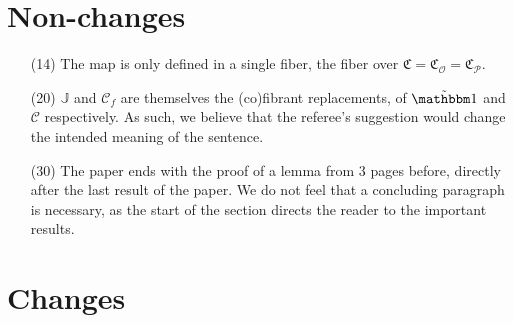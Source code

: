\documentclass[a4paper,10pt
]{article}%
\numberwithin{equation}{section}
\numberwithin{figure}{section}
\theoremstyle{definition} %
\renewcommand{\O}{\ensuremath{\mathcal O}}
\renewcommand{\P}{\ensuremath{\mathcal P}}
\newcommand{\1}{\ensuremath{\mathbbm 1}}%
\begin{document}


      

\section{Non-changes}

\begin{enumerate}
\item[(14)] The map is only defined in a single fiber, the fiber over $\mathfrak C = \mathfrak C_\O = \mathfrak C_\P$.
\item[(20)] $\mathbb J$ and $\mathcal C_f$ are themselves the (co)fibrant replacements, of $\tilde{\mathbbm 1}$ and $\mathcal C$ respectively. As such, we believe that the referee's suggestion would change the intended meaning of the sentence.
\item[(30)] The paper ends with the proof of a lemma from 3 pages before, directly after the last result of the paper. We do not feel that a concluding paragraph is necessary, as the start of the section directs the reader to the important results.
\end{enumerate}

\section{Changes}
\end{document}
